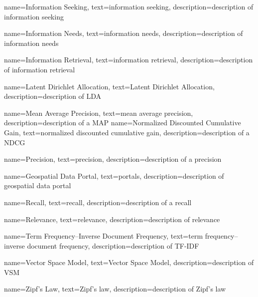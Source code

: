 {
    name=Information Seeking,
    text=information seeking,
    description=description of information seeking
}

{
    name=Information Needs,
    text=information needs,
    description=description of information needs
}

{
    name=Information Retrieval,
    text=information retrieval,
    description=description of information retrieval
}

{
    name=Latent Dirichlet Allocation,
    text=Latent Dirichlet Allocation,
    description=description of LDA
}

{
    name=Mean Average Precision,
    text=mean average precision,
    description=description of a MAP
}
{
    name=Normalized Discounted Cumulative Gain,
    text=normalized discounted cumulative gain,
    description=description of a NDCG
}

{
    name=Precision,
    text=precision,
    description=description of a precision
}

{
    name=Geospatial Data Portal,
    text=portals,
    description=description of geospatial data portal
}

{
    name=Recall,
    text=recall,
    description=description of a recall
}

{
    name=Relevance,
    text=relevance,
    description=description of relevance
}

{
    name=Term Frequency–Inverse Document Frequency,
    text=term frequency–inverse document frequency,
    description=description of TF-IDF
}

{
    name=Vector Space Model,
    text=Vector Space Model,
    description=description of VSM
}

{
    name=Zipf's Law,
    text=Zipf's law,
    description=description of Zipf's law
}